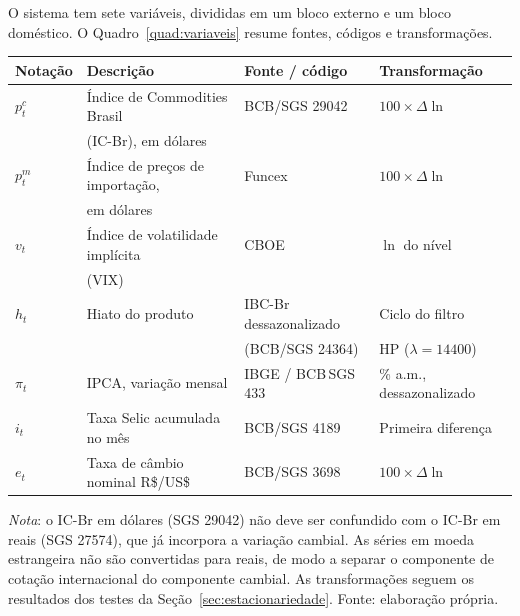 \documentclass[12pt,openright,oneside,a4paper,portuguese,brazil]{abntex2}
\begin{document}
O sistema tem sete variáveis, divididas em um bloco externo e um bloco
doméstico. O Quadro~\ref{quad:variaveis} resume fontes, códigos e
transformações.

\begin{quadroabnt}[htbp]
\centering
\caption{Variáveis do sistema: notação, descrição, fonte e transformação}
\label{quad:variaveis}
\footnotesize
\begin{tabular}{llll}
\toprule
Notação & Descrição & Fonte / código & Transformação \\
\midrule
$p^{c}_t$ & Índice de Commodities Brasil        & BCB/SGS 29042 & $100\times\Delta\ln$ \\
          & (IC-Br), em dólares                 &               & \\
$p^{m}_t$ & Índice de preços de importação,     & Funcex        & $100\times\Delta\ln$ \\
          & em dólares                          &               & \\
$v_t$     & Índice de volatilidade implícita    & CBOE          & $\ln$ do nível \\
          & (VIX)                               &               & \\
$h_t$     & Hiato do produto                    & IBC-Br dessazonalizado & Ciclo do filtro \\
          &                                     & (BCB/SGS 24364) & HP ($\lambda = 14400$) \\
$\pi_t$   & IPCA, variação mensal               & IBGE / BCB\,SGS 433 & \% a.m., dessazonalizado \\
$i_t$     & Taxa Selic acumulada no mês         & BCB/SGS 4189  & Primeira diferença \\
$e_t$     & Taxa de câmbio nominal R\$/US\$     & BCB/SGS 3698  & $100\times\Delta\ln$ \\
\bottomrule
\end{tabular}

\vspace{2pt}
\begin{flushleft}\footnotesize
\textit{Nota}: o IC-Br em dólares (SGS 29042) não deve ser confundido com o
IC-Br em reais (SGS 27574), que já incorpora a variação cambial. As séries em
moeda estrangeira não são convertidas para reais, de modo a separar o
componente de cotação internacional do componente cambial. As transformações
seguem os resultados dos testes da Seção~\ref{sec:estacionariedade}. Fonte:
elaboração própria.
\end{flushleft}
\end{quadroabnt}
\end{document}
